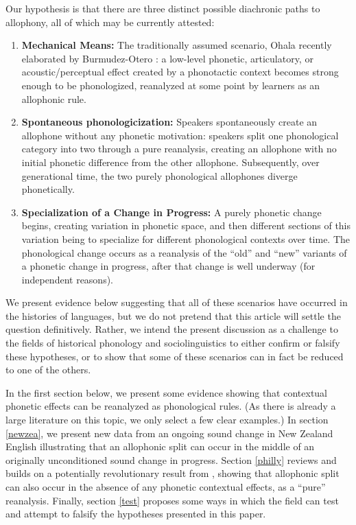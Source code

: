 Our hypothesis is that there are three distinct possible diachronic paths to allophony, all of which may be currently attested:
\begin{enumerate}
    \item \textbf{Mechanical Means:} The traditionally assumed scenario, Ohala  recently elaborated by Burmudez-Otero : a low-level phonetic, articulatory, or acoustic/perceptual effect created by a phonotactic context becomes strong enough to be phonologized, reanalyzed at some point by learners as an allophonic rule. 
    \item \textbf{Spontaneous phonologicization:} Speakers spontaneously create an allophone without any phonetic motivation: speakers split one phonological category into two through a pure reanalysis, creating an allophone with no initial phonetic difference from the other allophone. Subsequently, over generational time, the two purely phonological allophones diverge phonetically.
    \item \textbf{Specialization of a Change in Progress:} A purely phonetic change begins, creating variation in phonetic space, and then different sections of this variation being to specialize for different phonological contexts over time. The phonological change occurs as a reanalysis of the ``old'' and ``new'' variants of a phonetic change in progress, after that change is well underway (for independent reasons). \\
\end{enumerate}
\noindent We present evidence below suggesting that all of these scenarios have occurred in the histories of languages, but we do not pretend that this article will settle the question definitively. Rather, we intend the present discussion as a challenge to the fields of historical phonology and sociolinguistics to either confirm or falsify these hypotheses, or to show that some of these scenarios can in fact be reduced to one of the others.

In the first section below, we present some evidence showing that contextual phonetic effects can be reanalyzed as phonological rules. (As there is already a large literature on this topic, we only select a few clear examples.) In section \ref{newzea}, we present new data from an ongoing sound change in New Zealand English illustrating that an allophonic split can occur in the middle of an originally unconditioned sound change in progress. Section \ref{philly} reviews and builds on a potentially revolutionary result from \citet{fruehwald2013}, showing that allophonic split can also occur in the absence of any phonetic contextual effects, as a ``pure'' reanalysis. Finally, section \ref{test} proposes some ways in which the field can test and attempt to falsify the hypotheses presented in this paper.

